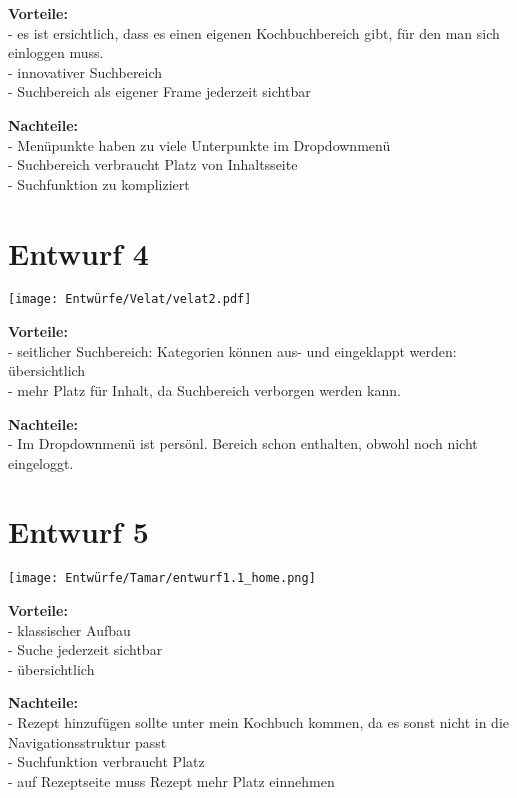 \documentclass[parskip,10pt,abstracton]{scrartcl}
\begin{document}
\textbf{Vorteile:}\\
- es ist ersichtlich, dass es einen eigenen Kochbuchbereich gibt, für den man sich einloggen muss.\\
- innovativer Suchbereich\\
- Suchbereich als eigener Frame jederzeit sichtbar


\textbf{Nachteile:}\\
- Menüpunkte haben zu viele Unterpunkte im Dropdownmenü\\
- Suchbereich verbraucht Platz von Inhaltsseite\\
- Suchfunktion zu kompliziert

\section*{Entwurf 4} %

\texttt{[image: Entwürfe/Velat/velat2.pdf]}


\textbf{Vorteile:}\\
- seitlicher Suchbereich: Kategorien können aus- und eingeklappt werden: übersichtlich\\
- mehr Platz für Inhalt, da Suchbereich verborgen werden kann.

\textbf{Nachteile:}\\
- Im Dropdownmenü ist persönl. Bereich schon enthalten, obwohl noch nicht eingeloggt.

\newpage
\section*{Entwurf 5} %

\texttt{[image: Entwürfe/Tamar/entwurf1.1\_home.png]}



\textbf{Vorteile:}\\
- klassischer Aufbau\\
- Suche jederzeit sichtbar\\
- übersichtlich

\textbf{Nachteile:}\\
- Rezept hinzufügen sollte unter mein Kochbuch kommen, da es sonst nicht in die Navigationsstruktur passt\\
- Suchfunktion verbraucht Platz\\
- auf Rezeptseite muss Rezept mehr Platz einnehmen
\newpage
\end{document}
